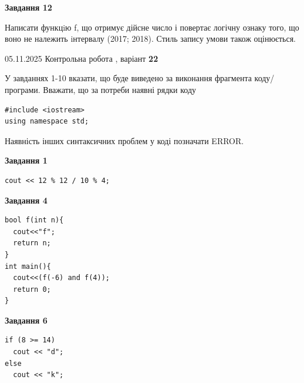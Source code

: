 \documentclass[12pt, ukrainian]{article}
\begin{document}
{\begin {large}
\begin{minipage}[t]{11.0cm}
\begin{center}
\textbf{Завдання 12}
\end{center}

Написати функцiю f, що отримує дійсне число і повертає логічну ознаку того, що воно не належить iнтервалу (2017; 2018). Стиль запису умови також оцінюється.\par

\end{minipage}

\end {large}}
\newpage

{\Large{05.11.2025 Контрольна робота , варіант  \No \textbf { 22 }\par}}
{
\begin {large}
У завданнях 1-10 вказати, що буде виведено за виконання фрагмента коду/про\-гра\-ми.
Вважати, що за потреби наявні рядки коду
\begin{verbatim}
#include <iostream>
using namespace std;
\end{verbatim}
Наявність інших синтаксичних проблем у коді позначати ERROR.

\begin{minipage}[t]{7.0cm}

\begin{center}
\textbf{Завдання 1}
\end{center}
\vspace{-8mm}

\begin{verbatim}
cout << 12 % 12 / 10 % 4;
\end{verbatim}



\begin{center}
\textbf{Завдання 4}
\end{center}
\vspace{-8mm}

\begin{verbatim}
bool f(int n){
  cout<<"f";
  return n;
}
int main(){
  cout<<(f(-6) and f(4));
  return 0;
}
\end{verbatim}



\begin{center}
\textbf{Завдання 6}
\end{center}
\vspace{-8mm}

\begin{verbatim}
if (8 >= 14)
  cout << "d";
else
  cout << "k";
\end{verbatim}




\end{minipage}
\end{large}}
\end{document}

